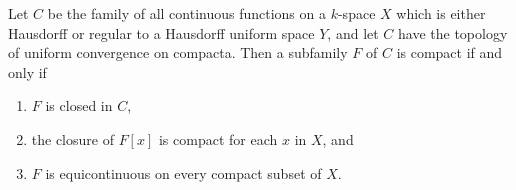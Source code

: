 Let $C$ be the family of all continuous functions on a $k$-space $X$ which is either Hausdorff or regular to a Hausdorff uniform space $Y$, and let $C$ have the topology of uniform convergence on compacta. Then a subfamily $F$ of $C$ is compact if and only if

\begin{enumerate}
\item[(a)] $F$ is closed in $C$,
\item[(b)] the closure of $F[x]$ is compact for each $x$ in $X$, and
\item[(c)] $F$ is equicontinuous on every compact subset of $X$.
\end{enumerate}
